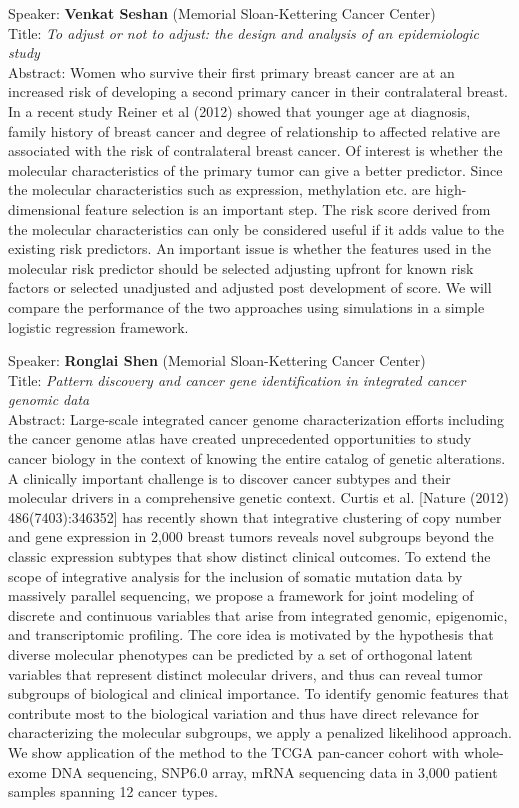 \documentclass[11pt]{article}
\begin{document}
\bigskip
\noindent
Speaker: {\bf Venkat Seshan} (Memorial Sloan-Kettering Cancer Center)\\
Title: {\it To adjust or not to adjust: the design and analysis of an epidemiologic study}\\
Abstract: Women who survive their first primary breast cancer are at an
increased risk of developing a second primary cancer in their
contralateral breast. In a recent study Reiner et al (2012) showed
that younger age at diagnosis, family history of breast cancer and
degree of relationship to affected relative are associated with the
risk of contralateral breast cancer. Of interest is whether the
molecular characteristics of the primary tumor can give a better
predictor. Since the molecular characteristics such as expression,
methylation etc. are high-dimensional feature selection is an
important step. The risk score derived from the molecular
characteristics can only be considered useful if it adds value to the
existing risk predictors. An important issue is whether the features
used in the molecular risk predictor should be selected adjusting
upfront for known risk factors or selected unadjusted and adjusted
post development of score. We will compare the performance of the two
approaches using simulations in a simple logistic regression
framework.

\bigskip
\noindent
Speaker: {\bf Ronglai Shen} (Memorial Sloan-Kettering Cancer Center)\\
Title: {\it Pattern discovery and cancer gene identification in integrated cancer genomic data}\\
Abstract: Large-scale integrated cancer genome characterization
efforts including the cancer genome atlas have created unprecedented
opportunities to study cancer biology in the context of knowing the
entire catalog of genetic alterations. A clinically important
challenge is to discover cancer subtypes and their molecular drivers
in a comprehensive genetic context.  Curtis et al. [Nature (2012)
486(7403):346­352] has recently shown that integrative clustering of
copy number and gene expression in 2,000 breast tumors reveals novel
subgroups beyond the classic expression subtypes that show distinct
clinical outcomes. To extend the scope of integrative analysis for the
inclusion of somatic mutation data by massively parallel sequencing,
we propose a framework for joint modeling of discrete and continuous
variables that arise from integrated genomic, epigenomic, and
transcriptomic profiling. The core idea is motivated by the hypothesis
that diverse molecular phenotypes can be predicted by a set of
orthogonal latent variables that represent distinct molecular drivers,
and thus can reveal tumor subgroups of biological and clinical
importance. To identify genomic features that contribute most to the
biological variation and thus have direct relevance for characterizing
the molecular subgroups, we apply a penalized likelihood approach. We
show application of the method to the TCGA pan-cancer cohort with
whole-exome DNA sequencing, SNP6.0 array, mRNA sequencing data in
3,000 patient samples spanning 12 cancer types.
\end{document}
